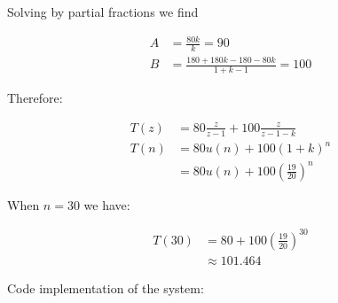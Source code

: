 Solving by partial fractions we find 

\begin{equation*}
\begin{aligned}
A &= \frac{80k}{k} = 90 \\
B &= \frac{180+180k-180-80k}{1+k-1} = 100
\end{aligned}
\end{equation*} 

Therefore:

\begin{equation*}
\begin{aligned}
T(z) &= 80 \frac{z}{z-1} + 100 \frac{z}{z-1-k} \\
T(n) &= 80 u(n) + 100 (1+k)^n \\
&= 80 u(n) + 100 (\frac{19}{20})^n
\end{aligned}
\end{equation*} 

When $n=30$ we have:

\begin{equation*}
\begin{aligned}
T(30) &= 80 + 100(\frac{19}{20})^{30} \\
 &\approx 101.464
\end{aligned}
\end{equation*} 

Code implementation of the system:



